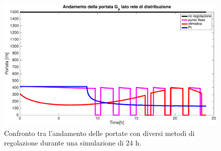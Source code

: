 \documentclass[laurea,oneside,11pt]{USiena_tesiLM}
\begin{document}
\begin{figure}[!ht]
\centering
\includegraphics[width=\textwidth]{figure/portate_confronto} 
\caption{Confronto tra l'andamento delle portate con diversi metodi di regolazione durante una simulazione di 24 h.}
\label{fig:portate_confronto}
\end{figure}
\end{document}
